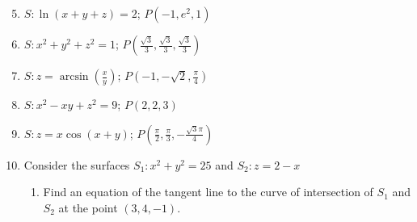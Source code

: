 \documentclass[12pt]{article}
\newif\ifans
\begin{document}
\begin{enumerate}
\setcounter{enumi}{4}

\item $S: \ln{(x+y+z)}=2$; $P(-1,e^2,1)$

\ifans{\fbox{$x+y+z=e^2$; $\overrightarrow{\ell}(t)=\langle -1,e^2,1\rangle +t\langle 1,1,1\rangle$}} \fi

\item $S: x^2+y^2+z^2=1$; $P\left(\frac{\sqrt{3}}{3}, \frac{\sqrt{3}}{3}, \frac{\sqrt{3}}{3} \right)$

\ifans{\fbox{$x+y+z=\sqrt{3}$; $\overrightarrow{\ell}(t)=\left \langle \frac{\sqrt{3}}{3}, \frac{\sqrt{3}}{3}, \frac{\sqrt{3}}{3}\right \rangle +t\langle 1,1,1 \rangle$}} \fi

\item $S: z=\arcsin{\left(\frac{x}{y}\right)}$; $P\left(-1, -\sqrt{2}, \frac{\pi}{4}\right)$

\ifans{\fbox{$-x+\frac{\sqrt{2}}{2}y-z=-\frac{\pi}{4}$; $\overrightarrow{\ell}(t)=\left\langle-1,-\sqrt{2},\frac{\pi}{4}\right\rangle+t\left\langle-1,\frac{\sqrt{2}}{2},-1\right\rangle$}} \fi

\item $S: x^2-xy+z^2=9$; $P(2,2,3)$

\ifans{\fbox{$x-y+3z=9$; $\overrightarrow{\ell}(t)=\langle 2,2,3\rangle+t\langle1,-1,3\rangle$}} \fi

\item $S: z=x\cos{(x+y)}$; $P\left(\frac{\pi}{2}, \frac{\pi}{3}, -\frac{\sqrt{3}\pi}{4}\right)$

\ifans{\fbox{\parbox{0.7\linewidth}{$(\pi+2\sqrt{3})\left(x-\frac{\pi}{2}\right)+\pi\left(y-\frac{\pi}{3}\right)+4\left(z+\frac{\sqrt{3}\pi}{4}\right)=0$\\
$\overrightarrow{\ell}(t)=\left\langle \frac{\pi}{2},\frac{\pi}{3},-\frac{\pi\sqrt{3}}{4}\right\rangle+t\left\langle \pi+2\sqrt{3},\pi,4\right\rangle$
}}} \fi

\item Consider the surfaces $S_1: x^2+y^2=25$ and $S_2: z=2-x$

\begin{enumerate}

\item Find an equation of the tangent line to the curve of intersection of $S_1$ and $S_2$ at the point $(3,4,-1)$.

\ifans{\fbox{$\overrightarrow{\ell}(t)=\langle 3,4,-1\rangle+t\langle -4,3,4 \rangle$}} \fi


\end{enumerate}
\end{enumerate}
\end{document}
